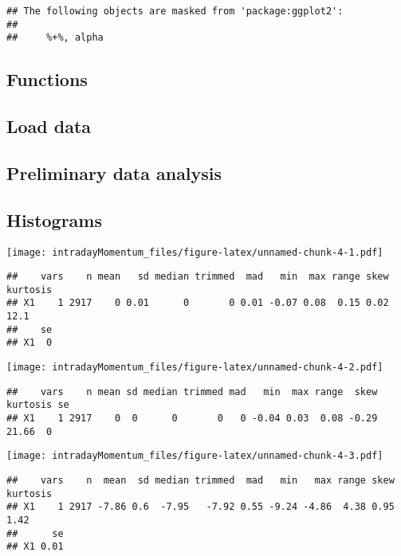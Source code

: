 \documentclass[]{article}
\begin{document}
\begin{verbatim}
## The following objects are masked from 'package:ggplot2':
## 
##     %+%, alpha
\end{verbatim}

\hypertarget{functions}{%
\subsection{Functions}\label{functions}}

\hypertarget{load-data}{%
\subsection{Load data}\label{load-data}}

\hypertarget{preliminary-data-analysis}{%
\subsection{Preliminary data analysis}\label{preliminary-data-analysis}}

\hypertarget{histograms}{%
\subsection{Histograms}\label{histograms}}

\texttt{[image: intradayMomentum\_files/figure-latex/unnamed-chunk-4-1.pdf]}

\begin{verbatim}
##    vars    n mean   sd median trimmed  mad   min  max range skew kurtosis
## X1    1 2917    0 0.01      0       0 0.01 -0.07 0.08  0.15 0.02     12.1
##    se
## X1  0
\end{verbatim}

\texttt{[image: intradayMomentum\_files/figure-latex/unnamed-chunk-4-2.pdf]}

\begin{verbatim}
##    vars    n mean sd median trimmed mad   min  max range  skew kurtosis se
## X1    1 2917    0  0      0       0   0 -0.04 0.03  0.08 -0.29    21.66  0
\end{verbatim}

\texttt{[image: intradayMomentum\_files/figure-latex/unnamed-chunk-4-3.pdf]}

\begin{verbatim}
##    vars    n  mean  sd median trimmed  mad   min   max range skew kurtosis
## X1    1 2917 -7.86 0.6  -7.95   -7.92 0.55 -9.24 -4.86  4.38 0.95     1.42
##      se
## X1 0.01
\end{verbatim}
\end{document}

